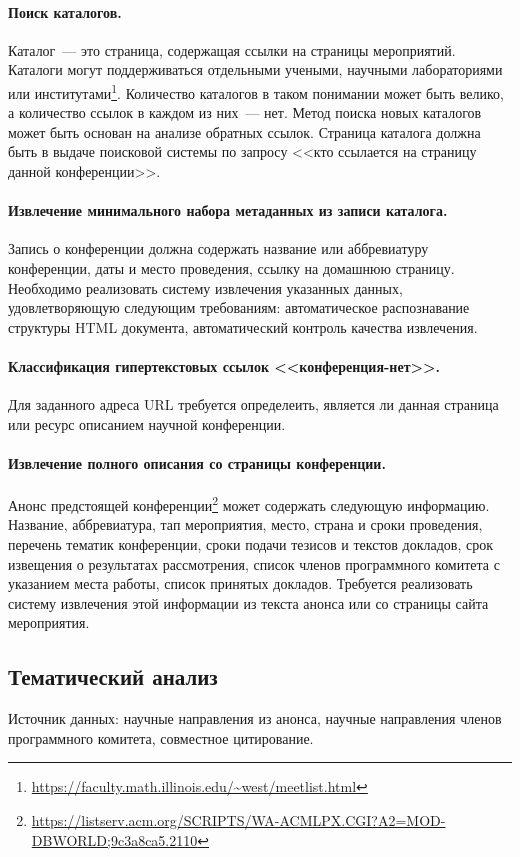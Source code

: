 \documentclass[12pt,oneside]{article}
\begin{document}
\paragraph{Поиск каталогов.} Каталог~--- это страница, содержащая ссылки на страницы мероприятий. Каталоги могут поддерживаться отдельными учеными, научными лабораториями или институтами\footnote{\url{https://faculty.math.illinois.edu/~west/meetlist.html}}. Количество каталогов в таком понимании может быть велико, а количество ссылок в каждом из них~--- нет. Метод поиска новых каталогов может быть основан на анализе обратных ссылок. Страница каталога должна быть в выдаче поисковой системы по запросу <<кто ссылается на страницу данной конференции>>.

\paragraph{Извлечение минимального набора метаданных из записи каталога.}
Запись о конференции должна содержать название или аббревиатуру конференции, даты и место проведения, ссылку на домашнюю страницу. Необходимо реализовать систему извлечения указанных данных, удовлетворяющую следующим требованиям: автоматическое распознавание структуры HTML документа, автоматический контроль качества извлечения.

\paragraph{Классификация гипертекстовых ссылок <<конференция-нет>>.} Для заданного адреса URL требуется определеить, является ли данная страница или ресурс описанием научной конференции.

\paragraph{Извлечение полного описания со страницы конференции.}
Анонс предстоящей конференции\footnote{\url{https://listserv.acm.org/SCRIPTS/WA-ACMLPX.CGI?A2=MOD-DBWORLD;9c3a8ca5.2110}} может содержать следующую информацию. Название, аббревиатура, тап мероприятия, место, страна и сроки проведения, перечень тематик конференции, сроки подачи тезисов и текстов докладов, срок извещения о результатах рассмотрения, список членов программного комитета с указанием места работы, список принятых докладов. Требуется реализовать систему извлечения этой информации из текста анонса или со страницы сайта мероприятия.

\subsection{Тематический анализ}
Источник данных: научные направления из анонса, научные направления членов программного комитета, совместное цитирование.
\end{document}
